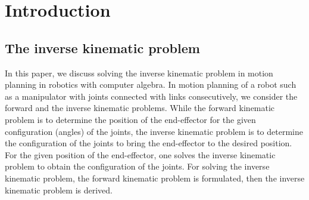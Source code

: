 \documentclass{birkjour}
\theoremstyle{plain}
\theoremstyle{definition}
\begin{document}
    \maketitle

    \section{Introduction}

    \subsection{The inverse kinematic problem}

    In this paper, we discuss solving the inverse kinematic problem in 
    motion planning in robotics \cite{sic-kha2008} with computer algebra. 
    In motion planning of a robot such as a manipulator with joints connected with links consecutively, we consider the forward and the inverse kinematic problems.
    While the forward kinematic problem is to determine the position of the end-effector 
    for the given configuration (angles) of the joints, 
    the inverse kinematic problem is to determine the configuration of the joints
    to bring the end-effector to the desired position.
    For the given position of the end-effector, one solves the inverse kinematic problem to obtain 
    the configuration of the joints.
    For solving the inverse kinematic problem, the forward kinematic problem is formulated,
    then the inverse kinematic problem is derived.

\end{document}
